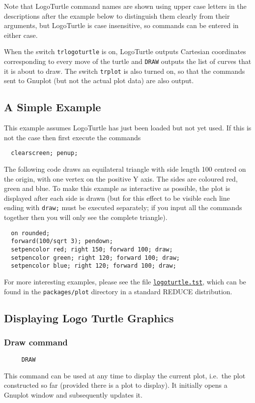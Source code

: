 Note that LogoTurtle command names are shown using upper case letters
in the descriptions after the example below to distinguish them
clearly from their arguments, but LogoTurtle is case insensitive, so
commands can be entered in either case.

When the switch \texttt{trlogoturtle} is on, LogoTurtle outputs
Cartesian coordinates corresponding to every move of the turtle and
\texttt{DRAW} outputs the list of curves that it is about to draw.
The switch \texttt{trplot} is also turned on, so that the commands
sent to Gnuplot (but not the actual plot data) are also output.


\subsection{A Simple Example}

This example assumes LogoTurtle has just been loaded but not yet used.
If this is not the case then first execute the commands
\begin{verbatim}
  clearscreen; penup;
\end{verbatim}

The following code draws an equilateral triangle with side length 100
centred on the origin, with one vertex on the positive Y axis.  The
sides are coloured red, green and blue.  To make this example as
interactive as possible, the plot is displayed after each side is
drawn (but for this effect to be visible each line ending with
\texttt{draw;} must be executed separately; if you input all the
commands together then you will only see the complete triangle).
\begin{verbatim}
  on rounded;
  forward(100/sqrt 3); pendown;
  setpencolor red; right 150; forward 100; draw;
  setpencolor green; right 120; forward 100; draw;
  setpencolor blue; right 120; forward 100; draw;
\end{verbatim}

For more interesting examples, please see the file
\href{https://sourceforge.net/p/reduce-algebra/code/HEAD/tree/trunk/packages/plot/logoturtle.tst}
     {\texttt{logoturtle.tst}}, which can be found in the
     \texttt{packages/plot} directory in a standard REDUCE
     distribution.


\subsection{Displaying Logo Turtle Graphics}

\subsubsection*{Draw command}
\begin{verbatim}
     DRAW
\end{verbatim}
\label{logoturtle:draw}
This command can be used at any time to display the current plot,
i.e.\ the plot constructed so far (provided there is a plot to
display).  It initially opens a Gnuplot window and subsequently
updates it.


